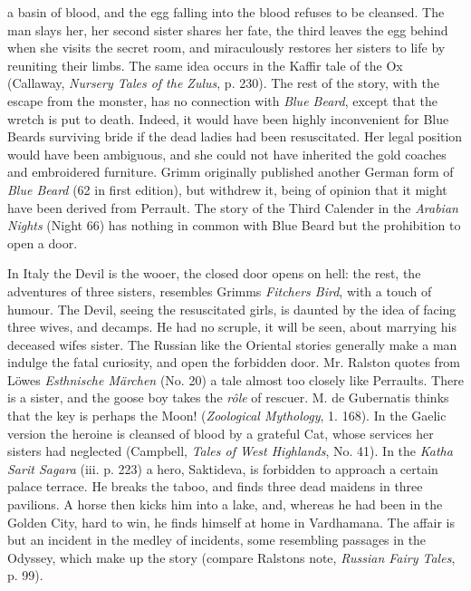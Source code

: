\documentclass[14pt,a4paper]{memoir}
\begin{document}
{a basin of blood, and the egg falling into the blood refuses to be
cleansed. The man slays her, her second sister shares her fate, the
third leaves the egg behind when she visits the secret room, and
miraculously restores her sisters to life by reuniting their limbs. The
same idea occurs in the Kaffir tale of the Ox (Callaway, \emph{Nursery
Tales of the Zulus}, p. 230). The rest of the story, with the escape
from the monster, has no connection with \emph{Blue Beard}, except that
the wretch is put to death. Indeed, it would have been highly
inconvenient for Blue Beard\textquotesingle s surviving bride if the
dead ladies had been resuscitated. Her legal position would have been
ambiguous, and she could not have inherited the gold coaches and
embroidered furniture. Grimm originally published another German form of
\emph{Blue Beard} (62 in first edition), but withdrew it, being of
opinion that it might have been derived from Perrault. The story of the
Third Calender in the \emph{Arabian Nights} (Night 66) has nothing in
common with Blue Beard but the prohibition to open a door.

In
Italy
the Devil is the wooer, the closed door opens on hell: the rest, the
adventures of three sisters, resembles Grimm\textquotesingle s
\emph{Fitcher\textquotesingle s Bird}, with a touch of humour. The
Devil, seeing the resuscitated girls, is daunted by the idea of facing
three wives, and decamps. He had no scruple, it will be seen, about
marrying his deceased wife\textquotesingle s sister. The Russian like
the Oriental stories generally make a man indulge the fatal curiosity,
and open the forbidden door. Mr. Ralston quotes from
Löwe\textquotesingle s \emph{Esthnische Märchen} (No. 20) a tale almost
too closely like Perrault\textquotesingle s. There is a sister, and the
goose boy takes the \emph{rôle} of rescuer. M. de Gubernatis thinks that
the key \textquotesingle is perhaps the Moon!\textquotesingle{}
(\emph{Zoological Mythology}, 1. 168). In the Gaelic version the heroine
is cleansed of blood by a grateful Cat, whose services her sisters had
neglected (Campbell, \emph{Tales of West Highlands}, No. 41). In the
\emph{Katha Sarit Sagara} (iii. p. 223) a hero, Saktideva, is forbidden
to approach a certain palace terrace. He breaks the taboo, and finds
three dead maidens in three pavilions. A horse then kicks him into a
lake, and, whereas he had been in the Golden City, hard to win, he finds
himself at home in Vardhamana. The affair is but an incident in the
medley of incidents, some resembling passages in the Odyssey, which make
up the story (compare Ralston\textquotesingle s note, \emph{Russian
Fairy Tales}, p. 99).

}
\end{document}
